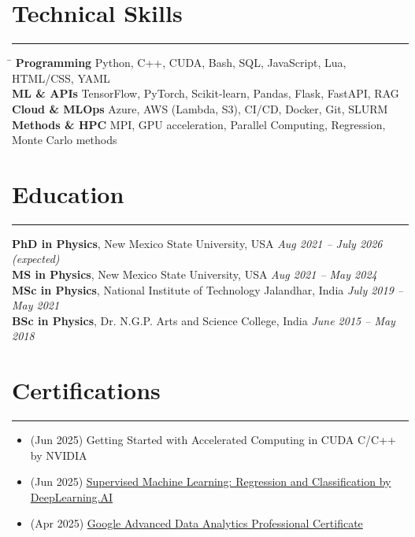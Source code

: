 \documentclass[11pt]{article}
\begin{document}
\section*{Technical Skills}
\hrule
\vspace{-0.3em}
\begin{tabbing}
\hspace{3.5cm} \= \kill
\textbf{Programming} \> Python, C++, CUDA, Bash, SQL, JavaScript, Lua, HTML/CSS, YAML \\
\textbf{ML \& APIs} \> TensorFlow, PyTorch, Scikit-learn, Pandas, Flask, FastAPI, RAG\\
\textbf{Cloud \& MLOps} \> Azure, AWS (Lambda, S3), CI/CD, Docker, Git, SLURM\\
\textbf{Methods \& HPC} \> MPI, GPU acceleration, Parallel Computing, Regression, Monte Carlo methods
\end{tabbing}

\section*{Education}
\hrule
\vspace{0.3em}

\textbf{PhD in Physics}, New Mexico State University, USA \hfill \textit{Aug 2021 – July 2026 (expected)} \\
\textbf{MS in Physics}, New Mexico State University, USA \hfill \textit{Aug 2021 – May 2024} \\
\textbf{MSc in Physics}, National Institute of Technology Jalandhar, India \hfill \textit{July 2019 – May 2021} \\
\textbf{BSc in Physics}, Dr. N.G.P. Arts and Science College, India \hfill \textit{June 2015 – May 2018}


\section*{Certifications}
\hrule
\vspace{-0.3em}
\begin{itemize}
    \item (Jun 2025) Getting Started with Accelerated Computing in CUDA C/C++ by NVIDIA
    \item (Jun 2025) \href{https://coursera.org/share/b9cffe9c5ba5832ffb99bf7abdd8c384}{Supervised Machine Learning: Regression and Classification by DeepLearning.AI} 
    \item (Apr 2025) \href{https://www.coursera.org/account/accomplishments/professional-cert/certificate/U0HU8UKT89L4}{Google Advanced Data Analytics Professional Certificate} 
\end{itemize}
\end{document}
